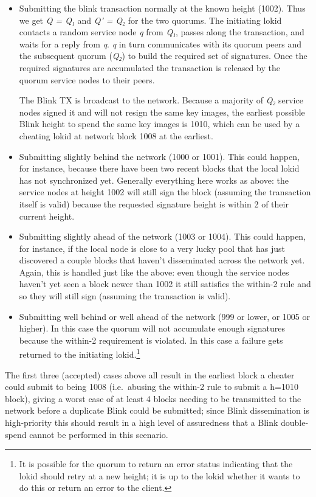 \begin{itemize}
\item
  Submitting the blink transaction normally at the known height (1002).
  Thus we get \emph{Q = Q₁} and \emph{Q' = Q₂} for the two quorums. The
  initiating lokid contacts a random service node \emph{q} from
  \emph{Q₁}, passes along the transaction, and waits for a reply from
  \emph{q}. \emph{q} in turn communicates with its quorum peers and the
  subsequent quorum (\emph{Q₂}) to build the required set of signatures.
  Once the required signatures are accumulated the transaction is
  released by the quorum service nodes to their peers.

  The Blink TX is broadcast to the network. Because a majority of
  \emph{Q₂} service nodes signed it and will not resign the same key
  images, the earliest possible Blink height to spend the same key
  images is 1010, which can be used by a cheating lokid at network block
  1008 at the earliest.
\item
  Submitting slightly behind the network (1000 or 1001). This could
  happen, for instance, because there have been two recent blocks that
  the local lokid has not synchronized yet. Generally everything here
  works as above: the service nodes at height 1002 will still sign the
  block (assuming the transaction itself is valid) because the requested
  signature height is within 2 of their current height.
\item
  Submitting slightly ahead of the network (1003 or 1004). This could
  happen, for instance, if the local node is close to a very lucky pool
  that has just discovered a couple blocks that haven't disseminated
  across the network yet. Again, this is handled just like the above:
  even though the service nodes haven't yet seen a block newer than 1002
  it still satisfies the within-2 rule and so they will still sign
  (assuming the transaction is valid).
\item
  Submitting well behind or well ahead of the network (999 or lower, or
  1005 or higher). In this case the quorum will not accumulate enough
  signatures because the within-2 requirement is violated. In this case
  a failure gets returned to the initiating lokid.\footnote{It is
    possible for the quorum to return an error status indicating that
    the lokid should retry at a new height; it is up to the lokid
    whether it wants to do this or return an error to the client.}
\end{itemize}

The first three (accepted) cases above all result in the earliest block
a cheater could submit to being 1008 (i.e.~abusing the within-2 rule to
submit a h=1010 block), giving a worst case of at least 4 blocks needing
to be transmitted to the network before a duplicate Blink could be
submitted; since Blink dissemination is high-priority this should result
in a high level of assuredness that a Blink double-spend cannot be
performed in this scenario.

